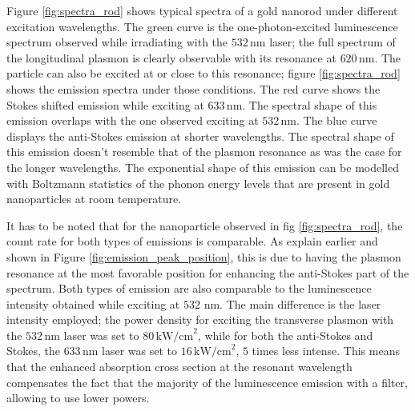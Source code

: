 \documentclass[journal=nalefd,manuscript=letter]{achemso}
\newcommand{\nm}{\ensuremath{\,\textrm{nm}}}
\newcommand{\pwr}{\ensuremath{\,\textrm{kW/cm}^2}}
\begin{document}
Figure \ref{fig:spectra_rod} shows typical spectra of a gold nanorod under
different excitation wavelengths. The green curve is the one-photon-excited
luminescence spectrum observed while irradiating with the $532\nm$ laser; the
full spectrum of the longitudinal plasmon is clearly observable with its
resonance at $620\nm$. The particle can also be excited at or close to this
resonance; figure \ref{fig:spectra_rod} shows the emission spectra under those
conditions. The red curve shows the Stokes shifted emission while exciting at
$633\nm$. The spectral shape of this emission overlaps with the one observed
exciting at $532\nm$. The blue curve displays the anti-Stokes emission at
shorter wavelengths. The spectral shape of this emission doesn't resemble that
of the plasmon resonance as was the case for the longer wavelengths. The
exponential shape of this emission can be modelled with Boltzmann statistics of
the phonon energy levels that are present in gold nanoparticles at room
temperature.

It has to be noted that for the nanoparticle observed in fig
\ref{fig:spectra_rod}, the count rate for both types of emissions is comparable.
As explain earlier and shown in Figure \ref{fig:emission_peak_position}, this is
due to having the plasmon resonance at the most favorable position for enhancing
the anti-Stokes part of the spectrum. Both types of emission are also comparable
to the luminescence intensity obtained while exciting at $532\,\nm$. The main
difference is the laser intensity employed; the power density for exciting the
transverse plasmon with the $532\nm$ laser was set to $80\pwr$, while for both
the anti-Stokes and Stokes, the $633\nm$ laser was set to $16\pwr$, $5$ times
less intense. This means that the enhanced absorption cross section at
the resonant wavelength compensates the fact that the majority
of the luminescence emission with a filter, allowing to use lower powers.
\end{document}
